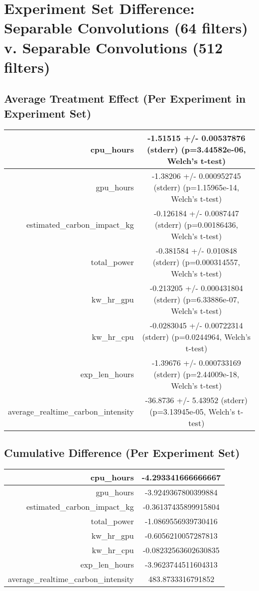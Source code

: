 \documentclass{article}%
\begin{document}
%
\normalsize%
\section{Experiment Set Difference: Separable Convolutions (64 filters) v. Separable Convolutions (512 filters)}%
\label{sec:Experiment Set Difference Separable Convolutions (64 filters) v. Separable Convolutions (512 filters)}%
\subsection{Average Treatment Effect (Per Experiment in Experiment Set)}%
\label{subsec:Average Treatment Effect (Per Experiment in Experiment Set)}%
\begin{tabular}{|r|c|}%
\hline%
cpu\_hours&{-}1.51515 +/{-} 0.00537876 (stderr) (p=3.44582e{-}06, Welch's t{-}test)\\%
\hline%
gpu\_hours&{-}1.38206 +/{-} 0.000952745 (stderr) (p=1.15965e{-}14, Welch's t{-}test)\\%
\hline%
estimated\_carbon\_impact\_kg&{-}0.126184 +/{-} 0.0087447 (stderr) (p=0.00186436, Welch's t{-}test)\\%
\hline%
total\_power&{-}0.381584 +/{-} 0.010848 (stderr) (p=0.000314557, Welch's t{-}test)\\%
\hline%
kw\_hr\_gpu&{-}0.213205 +/{-} 0.000431804 (stderr) (p=6.33886e{-}07, Welch's t{-}test)\\%
\hline%
kw\_hr\_cpu&{-}0.0283045 +/{-} 0.00722314 (stderr) (p=0.0244964, Welch's t{-}test)\\%
\hline%
exp\_len\_hours&{-}1.39676 +/{-} 0.000733169 (stderr) (p=2.44009e{-}18, Welch's t{-}test)\\%
\hline%
average\_realtime\_carbon\_intensity&{-}36.8736 +/{-} 5.43952 (stderr) (p=3.13945e{-}05, Welch's t{-}test)\\%
\hline%
\end{tabular}

%
\subsection{Cumulative Difference (Per Experiment Set)}%
\label{subsec:Cumulative Difference (Per Experiment Set)}%
\begin{tabular}{|r|c|}%
\hline%
cpu\_hours&{-}4.293341666666667\\%
\hline%
gpu\_hours&{-}3.9249367800399884\\%
\hline%
estimated\_carbon\_impact\_kg&{-}0.36137435899915804\\%
\hline%
total\_power&{-}1.0869556939730416\\%
\hline%
kw\_hr\_gpu&{-}0.6056210057287813\\%
\hline%
kw\_hr\_cpu&{-}0.08232563602630835\\%
\hline%
exp\_len\_hours&{-}3.9623744511604313\\%
\hline%
average\_realtime\_carbon\_intensity&483.8733316791852\\%
\hline%
\end{tabular}

%
\end{document}
